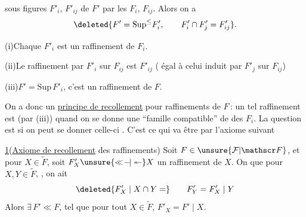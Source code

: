 sous figures $F'_i$, $F'_{ij}$ de $F'$  par
les $F_i$, $F_{ij}$. Alors on a
\[
\deleted{F'=\mathrm{Sup}^{\leq}F'_i,\qquad F'_i\cap F'_j=F'_{ij}}.
\]

(i)\quad Chaque $F'_i$ est un raffinement de $F_i$.

(ii)\quad Le raffinement  par $F'_i$ sur $F_{ij}$ est $F'_{ij}$
( égal à celui induit par $F'_j$ sur $F_{ij}$)

(iii)\quad $F'=\mathrm{Sup}\,F'_i$,   c'est un
raffinement de $F$.

On a donc un \uline{principe de recollement}
pour  raffinements de $F$\,: un tel
raffinement est  (par (iii)) quand
on se donne une ``famille compatible''
de  des $F_i$. La question est
si on peut se donner celle-ci .
C'est ce qui va être 
par l'axiome suivant

\uline{ 1}\quad (\uline{Axiome de recollement} des
raffinements) Soit $F\in\unsure{\mathcal F|\mathscr F}$, et pour 
$X\in\widetilde F$, soit $F'_X\unsure{\ll\!-\!|\twoheadleftarrow}X$  un raffinement
de $X$. On  que pour $X,Y\in\widetilde F$,
, on ait
\[
\deleted{F'_X\mid X\cap Y=}\qquad F'_Y=F'_X\mid Y
\]
Alors $\exists\,F'\ll F$, tel que pour tout $X\in\widetilde F$, $F'_X=F'\mid X$.

